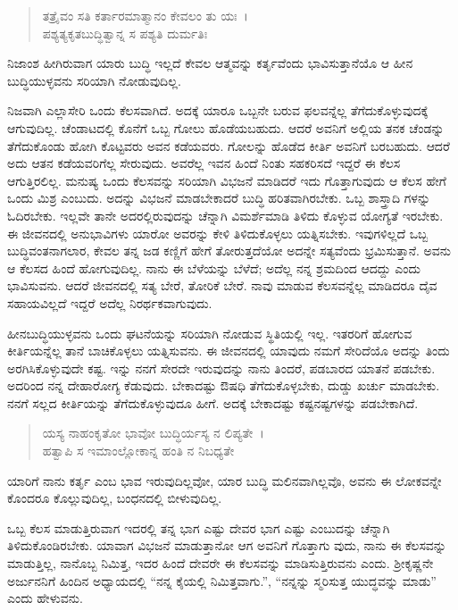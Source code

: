 \begin{verse}
ತತ್ರೈವಂ ಸತಿ ಕರ್ತಾರಮಾತ್ಮಾನಂ ಕೇವಲಂ ತು ಯಃ~।\\ಪಶ್ಯತ್ಯಕೃತಬುದ್ಧಿತ್ವಾನ್ನ ಸ ಪಶ್ಯತಿ ದುರ್ಮತಿಃ 
\end{verse}

{\small ನಿಜಾಂಶ ಹೀಗಿರುವಾಗ ಯಾರು ಬುದ್ಧಿ ಇಲ್ಲದೆ ಕೇವಲ ಆತ್ಮವನ್ನು ಕರ್ತೃವೆಂದು ಭಾವಿಸುತ್ತಾನೆಯೊ ಆ ಹೀನ ಬುದ್ಧಿಯುಳ್ಳವನು ಸರಿಯಾಗಿ ನೋಡುವುದಿಲ್ಲ.}

ನಿಜವಾಗಿ ಎಲ್ಲಾಸೇರಿ ಒಂದು ಕೆಲಸವಾಗಿದೆ. ಅದಕ್ಕೆ ಯಾರೂ ಒಬ್ಬನೇ ಬರುವ ಫಲವನ್ನೆಲ್ಲ ತೆಗೆದುಕೊಳ್ಳುವುದಕ್ಕೆ ಆಗುವುದಿಲ್ಲ. ಚೆಂಡಾಟದಲ್ಲಿ ಕೊನೆಗೆ ಒಬ್ಬ ಗೋಲು ಹೊಡೆಯಬಹುದು. ಆದರೆ ಅವನಿಗೆ ಅಲ್ಲಿಯ ತನಕ ಚೆಂಡನ್ನು ತೆಗೆದುಕೊಂಡು ಹೋಗಿ ಕೊಟ್ಟವರು ಅವನ ಕಡೆಯವರು. ಗೋಲನ್ನು ಹೊಡೆದ ಕೀರ್ತಿ ಅವನಿಗೆ ಬರಬಹುದು. ಆದರೆ ಅದು ಆತನ ಕಡೆಯವರಿಗೆಲ್ಲ ಸೇರುವುದು. ಅವರೆಲ್ಲ ಇವನ ಹಿಂದೆ ನಿಂತು ಸಹಕರಿಸದೆ ಇದ್ದರೆ ಈ ಕೆಲಸ ಆಗುತ್ತಿರಲಿಲ್ಲ. ಮನುಷ್ಯ ಒಂದು ಕೆಲಸವನ್ನು ಸರಿಯಾಗಿ ವಿಭಜನೆ ಮಾಡಿದರೆ ಇದು ಗೊತ್ತಾಗುವುದು ಆ ಕೆಲಸ ಹೇಗೆ ಒಂದು ಮಿಶ್ರ ಎಂಬುದು. ಅದನ್ನು ವಿಭಜನೆ ಮಾಡಬೇಕಾದರೆ ಬುದ್ಧಿ ಹರಿತವಾಗಿರಬೇಕು. ಒಬ್ಬ ಶಾಸ್ತ್ರಾದಿ ಗಳನ್ನು ಓದಿರಬೇಕು. ಇಲ್ಲವೇ ತಾನೇ ಅದರಲ್ಲಿರುವುದನ್ನು ಚೆನ್ನಾಗಿ ವಿಮರ್ಶೆಮಾಡಿ ತಿಳಿದು ಕೊಳ್ಳುವ ಯೋಗ್ಯತೆ ಇರಬೇಕು. ಈ ಜೀವನದಲ್ಲಿ ಅನುಭಾವಿಗಳು ಯಾರೋ ಅವರನ್ನು ಕೇಳಿ ತಿಳಿದುಕೊಳ್ಳಲು ಯತ್ನಿಸಬೇಕು. ಇವುಗಳಿಲ್ಲದೆ ಒಬ್ಬ ಬುದ್ಧಿವಂತನಾಗಲಾರ, ಕೇವಲ ತನ್ನ ಜಡ ಕಣ್ಣಿಗೆ ಹೇಗೆ ತೋರುತ್ತದೆಯೋ ಅದನ್ನೇ ಸತ್ಯವೆಂದು ಭ್ರಮಿಸುತ್ತಾನೆ. ಅವನು ಆ ಕೆಲಸದ ಹಿಂದೆ ಹೋಗುವುದಿಲ್ಲ. ನಾನು ಈ ಬೆಳೆಯನ್ನು ಬೆಳೆದೆ; ಅದೆಲ್ಲ ನನ್ನ ಶ್ರಮದಿಂದ ಆದದ್ದು ಎಂದು ಭಾವಿಸುವನು. ಆದರೆ ಜೀವನದಲ್ಲಿ ಸತ್ಯ ಬೇರೆ, ತೋರಿಕೆ ಬೇರೆ. ನಾವು ಮಾಡುವ ಕೆಲಸವನ್ನೆಲ್ಲ ಮಾಡಿದರೂ ದೈವ ಸಹಾಯವಿಲ್ಲದೆ ಇದ್ದರೆ ಅದೆಲ್ಲ ನಿರರ್ಥಕವಾಗುವುದು.

ಹೀನಬುದ್ಧಿಯುಳ್ಳವನು ಒಂದು ಘಟನೆಯನ್ನು ಸರಿಯಾಗಿ ನೋಡುವ ಸ್ಥಿತಿಯಲ್ಲಿ ಇಲ್ಲ. ಇತರರಿಗೆ ಹೋಗುವ ಕೀರ್ತಿಯನ್ನೆಲ್ಲ ತಾನೆ ಬಾಚಿಕೊಳ್ಳಲು ಯತ್ನಿಸುವನು. ಈ ಜೀವನದಲ್ಲಿ ಯಾವುದು ನಮಗೆ ಸೇರಿದೆಯೊ ಅದನ್ನು ತಿಂದು ಅರಗಿಸಿಕೊಳ್ಳುವುದೇ ಕಷ್ಟ. ಇನ್ನು ನನಗೆ ಸೇರದೇ ಇರುವುದನ್ನು ನಾನು ತಿಂದರೆ, ಪಡಬಾರದ ಯಾತನೆ ಪಡಬೇಕು. ಅದರಿಂದ ನನ್ನ ದೇಹಾರೋಗ್ಯ ಕೆಡುವುದು. ಬೇಕಾದಷ್ಟು ಔಷಧಿ ತೆಗೆದುಕೊಳ್ಳಬೇಕು, ದುಡ್ಡು ಖರ್ಚು ಮಾಡಬೇಕು. ನನಗೆ ಸಲ್ಲದ ಕೀರ್ತಿಯನ್ನು ತೆಗೆದುಕೊಳ್ಳುವುದೂ ಹೀಗೆ. ಅದಕ್ಕೆ ಬೇಕಾದಷ್ಟು ಕಷ್ಟನಷ್ಟಗಳನ್ನು ಪಡಬೇಕಾಗಿದೆ.

\begin{verse}
ಯಸ್ಯ ನಾಹಂಕೃತೋ ಭಾವೋ ಬುದ್ಧಿರ್ಯಸ್ಯ ನ ಲಿಪ್ಯತೇ~।\\ಹತ್ವಾಪಿ ಸ ಇಮಾಂಲ್ಲೋಕಾನ್ನ ಹಂತಿ ನ ನಿಬಧ್ಯತೇ 
\end{verse}

{\small ಯಾರಿಗೆ ನಾನು ಕರ್ತೃ ಎಂಬ ಭಾವ ಇರುವುದಿಲ್ಲವೋ, ಯಾರ ಬುದ್ಧಿ ಮಲಿನವಾಗಿಲ್ಲವೊ, ಅವನು ಈ ಲೋಕವನ್ನೇ ಕೊಂದರೂ ಕೊಲ್ಲುವುದಿಲ್ಲ, ಬಂಧನದಲ್ಲಿ ಬೀಳುವುದಿಲ್ಲ.}

ಒಬ್ಬ ಕೆಲಸ ಮಾಡುತ್ತಿರುವಾಗ ಇದರಲ್ಲಿ ತನ್ನ ಭಾಗ ಎಷ್ಟು ದೇವರ ಭಾಗ ಎಷ್ಟು ಎಂಬುದನ್ನು ಚೆನ್ನಾಗಿ ತಿಳಿದುಕೊಂಡಿರಬೇಕು. ಯಾವಾಗ ವಿಭಜನೆ ಮಾಡುತ್ತಾನೋ ಆಗ ಅವನಿಗೆ ಗೊತ್ತಾಗು ವುದು, ನಾನು ಈ ಕೆಲಸವನ್ನು ಮಾಡುತ್ತಿಲ್ಲ, ನಾನೊಬ್ಬ ನಿಮಿತ್ತ, ಇದರ ಹಿಂದೆ ದೇವರೇ ಈ ಕೆಲಸವನ್ನು ಮಾಡಿಸುತ್ತಿರುವನು ಎಂದು. ಶ‍್ರೀಕೃಷ್ಣನೇ ಅರ್ಜುನನಿಗೆ ಹಿಂದಿನ ಅಧ್ಯಾಯದಲ್ಲಿ “ನನ್ನ ಕೈಯಲ್ಲಿ ನಿಮಿತ್ತವಾಗು.”, “ನನ್ನನ್ನು ಸ್ಮರಿಸುತ್ತ ಯುದ್ಧವನ್ನು ಮಾಡು” ಎಂದು ಹೇಳುವನು.

